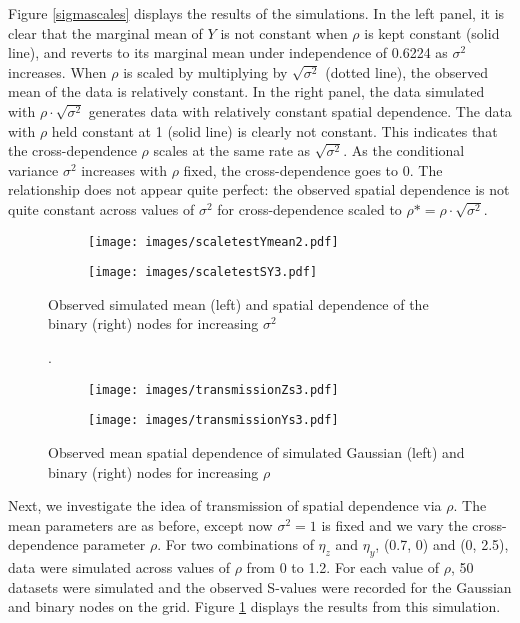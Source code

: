 \documentclass[12pt, a4paper, twoside]{article}
\begin{document}
Figure \ref{sigmascales} displays the results of the simulations. In the left panel, it is clear that the marginal mean of $Y$ is not constant when $\rho$ is kept constant (solid line), and reverts to its marginal mean under independence of 0.6224 as $\sigma^2$ increases. When $\rho$ is scaled by multiplying by $\sqrt{\sigma^2}$ (dotted line), the observed mean of the data is relatively constant. In the right panel, the data simulated with $\rho\cdot\sqrt{\sigma^2}$ generates data with relatively constant spatial dependence. The data with $\rho$ held constant at 1 (solid line) is clearly not constant. This indicates that the cross-dependence $\rho$ scales at the same rate as $\sqrt{\sigma^2}$. As the conditional variance $\sigma^2$ increases with $\rho$ fixed, the cross-dependence goes to 0. The relationship does not appear quite perfect: the observed spatial dependence is not quite constant across values of $\sigma^2$ for cross-dependence scaled to $\rho*=\rho\cdot\sqrt{\sigma^2}$.
\begin{figure}[h]
	    \centering
	\begin{subfigure}{0.45\textwidth}
		\texttt{[image: images/scaletestYmean2.pdf]}%
	\end{subfigure}
	\begin{subfigure}{0.45\textwidth}
		\texttt{[image: images/scaletestSY3.pdf]}%
	\end{subfigure}
	\caption[Mean and Spatial Dependence of binary data for increasing $\sigma^2$]{Observed simulated mean (left) and spatial dependence of the binary (right) nodes for increasing $\sigma^2$}.
	\label{sigmascales}
	\vspace{.8cm}
		\centering
	\begin{subfigure}{0.45\textwidth}
		\texttt{[image: images/transmissionZs3.pdf]}%
	\end{subfigure}
	\begin{subfigure}{0.45\textwidth}
		\texttt{[image: images/transmissionYs3.pdf]}%
	\end{subfigure}
	\caption[Observed Spatial Dependence for Increasing Cross-Dependence]{Observed mean spatial dependence of simulated Gaussian (left) and binary (right) nodes for increasing $\rho$}
	\label{transmitS}
\end{figure}

Next, we investigate the idea of transmission of spatial dependence via $\rho$. The mean parameters are as before, except now $\sigma^2=1$ is fixed and we vary the cross-dependence parameter $\rho$. For two combinations of $\eta_z$ and $\eta_y$, (0.7, 0) and (0, 2.5), data were simulated across values of $\rho$ from 0 to 1.2. For each value of $\rho$, 50 datasets were simulated and the observed S-values were recorded for the Gaussian and binary nodes on the grid. Figure \ref{transmitS} displays the results from this simulation.
\end{document}
